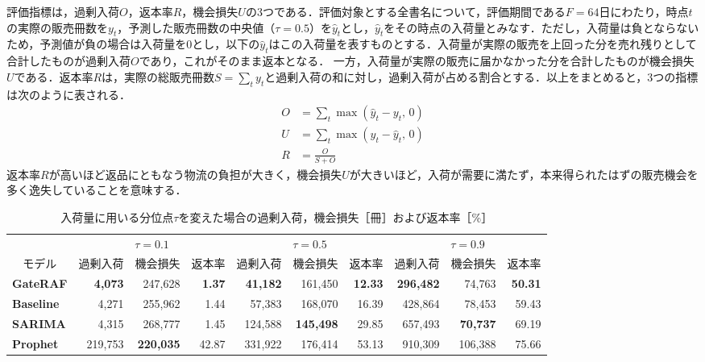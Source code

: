 \documentclass[twocolumn, lastpage]{jarticle}
\newif\ifrevmark
\newcommand{\revB}[1]{\ifrevmark{\color{red}#1}\else#1\fi}
\newcommand{\revBcolor}{\ifrevmark\color{red}\fi}
\begin{document}
評価指標は，過剰入荷$O$，返本率$R$，機会損失$U$の3つである．評価対象とする全書名について，評価期間である$F=64$日にわたり，時点$t$の実際の販売冊数を$y_t$，予測した販売冊数の中央値（$\tau=0.5$）を$\hat{y}_t$とし，$\hat{y}_t$をその時点の入荷量とみなす．\revB{ただし，入荷量は負とならないため，予測値が負の場合は入荷量を$0$とし，以下の$\hat{y}_t$はこの入荷量を表すものとする．}入荷量が実際の販売を上回った分を売れ残りとして合計したものが過剰入荷$O$であり，これがそのまま返本となる．
一方，入荷量が実際の販売に届かなかった分を合計したものが機会損失$U$である．返本率$R$は，実際の総販売冊数$S=\sum_t y_t$と過剰入荷の和に対し，過剰入荷が占める割合とする．以上をまとめると，3つの指標は次のように表される．
    \begin{align}
        O &= \sum_t \max(\hat{y}_t - y_t,\, 0) \\
        U &= \sum_t \max(y_t - \hat{y}_t,\, 0) \\
        R &= \frac{O}{S + O}
    \end{align}
返本率$R$が高いほど返品にともなう物流の負担が大きく，機会損失$U$が大きいほど，入荷が需要に満たず，本来得られたはずの販売機会を多く逸失していることを意味する．
\begin{table}[t]
    \revBcolor
    \caption{入荷量に用いる分位点$\tau$を変えた場合の過剰入荷，機会損失［冊］および返本率［\%］}
    \label{tab:quantile_sensitivity}
    \centering
    \setlength{\tabcolsep}{4pt}%
    \begin{tabular}{lrrrrrrrrr}
        \hline
        & \multicolumn{3}{c}{$\tau=0.1$} & \multicolumn{3}{c}{$\tau=0.5$} & \multicolumn{3}{c}{$\tau=0.9$} \\
        \cline{2-4} \cline{5-7} \cline{8-10}
        \multicolumn{1}{c}{モデル} & \multicolumn{1}{c}{過剰入荷} & \multicolumn{1}{c}{機会損失} & \multicolumn{1}{c}{返本率} & \multicolumn{1}{c}{過剰入荷} & \multicolumn{1}{c}{機会損失} & \multicolumn{1}{c}{返本率} & \multicolumn{1}{c}{過剰入荷} & \multicolumn{1}{c}{機会損失} & \multicolumn{1}{c}{返本率} \\
        \hline\hline
        \textbf{GateRAF} & \textbf{4{,}073} & 247{,}628 & \textbf{1.37} & \textbf{41{,}182} & 161{,}450 & \textbf{12.33} & \textbf{296{,}482} & 74{,}763 & \textbf{50.31} \\
        \textbf{Baseline} & 4{,}271 & 255{,}962 & 1.44 & 57{,}383 & 168{,}070 & 16.39 & 428{,}864 & 78{,}453 & 59.43 \\
        \textbf{SARIMA} & 4{,}315 & 268{,}777 & 1.45 & 124{,}588 & \textbf{145{,}498} & 29.85 & 657{,}493 & \textbf{70{,}737} & 69.19 \\
        \textbf{Prophet} & 219{,}753 & \textbf{220{,}035} & 42.87 & 331{,}922 & 176{,}414 & 53.13 & 910{,}309 & 106{,}388 & 75.66 \\
        \hline
    \end{tabular}
\end{table}
\end{document}
